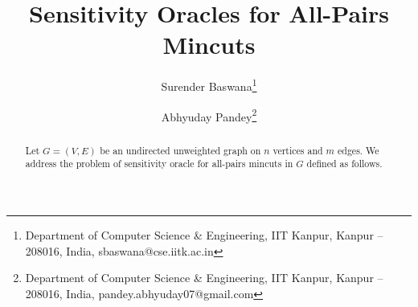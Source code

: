 \documentclass[letterpaper,11pt]{article}
\begin{document}
\begin{titlepage}

\title{Sensitivity Oracles for All-Pairs Mincuts}
\author{
  Surender Baswana\thanks{Department of Computer Science \& Engineering, IIT Kanpur, Kanpur -- 208016, India, sbaswana@cse.iitk.ac.in}
  \and
  Abhyuday Pandey\thanks{Department of Computer Science \& Engineering, IIT Kanpur, Kanpur -- 208016, India, pandey.abhyuday07@gmail.com}
}
\maketitle

\begin{abstract}





{
Let $G=(V,E)$ be an undirected unweighted graph on $n$ vertices and $m$ edges. We address the problem of sensitivity oracle for all-pairs mincuts in $G$ defined as follows.

}
\end{abstract}
\end{titlepage}
\end{document}

